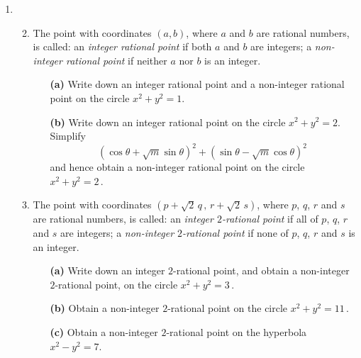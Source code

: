 \documentclass[a4, 11pt]{report}
\newlength{\qspace}
\newcounter{qnumber}
\newenvironment{question}%
 {\vspace{\qspace}
  \begin{enumerate}[\bfseries 1\quad][10]%
    \setcounter{enumi}{\value{qnumber}}%
    \item%
 }
{
  \end{enumerate}
  \filbreak
  \stepcounter{qnumber}
 }
\newenvironment{questionparts}[1][1]%
 {
  \begin{enumerate}[\bfseries (i)]%
    \setcounter{enumii}{#1}
    \addtocounter{enumii}{-1}
    \setlength{\itemsep}{5mm}
    \setlength{\parskip}{8pt}
 }
 {
  \end{enumerate}
 }
\begin{document}
\begin{question}
\begin{questionparts}
\item The point with coordinates $(a, b)$, 
where $a$ and $b$  are rational numbers,
  is called:
\newline
\hspace*{1cm} 
an {\em integer rational point} if both $a$ and $b$ are integers;
\newline\hspace*{1cm}
a {\em non-integer rational point} if neither $a$ nor $b$ is an integer.





\begin{itemize}

\item[\bf (a)]
Write down an integer rational point and a non-integer rational point
on the circle $x^2+y^2 =1$.

\item [\bf (b)]
 Write down an integer rational point on the circle
$x^2+y^2=2$.
Simplify
\[
(\cos\theta + \sqrt m \sin\theta)^2 +
(\sin\theta - \sqrt m \cos\theta)^2 \,
\]
and hence obtain a non-integer rational point on the circle $x^2+y^2=2\,$.
\end{itemize}

\item
The point with coordinates $(p+\sqrt 2 \, q\,,\, r+\sqrt 2 \, s)$, where
 $p$, $q$, $r$ and $s$ 
are rational numbers, is called:
\newline\hspace*{1cm}
an {\em integer $2$-rational point} if all of 
 $p$, $q$, $r$ and $s$ 
 are integers;
\newline\hspace*{1cm}
a {\em non-integer $2$-rational point} if none of  
 $p$, $q$, $r$ and $s$ 
 is an integer.


\begin{itemize}
\item[\bf (a)]
Write down an  integer $2$-rational point, and 
obtain a non-integer $2$-rational point, on  the circle $x^2+y^2=3\,$.

\item [\bf(b)]
Obtain a non-integer $2$-rational point 
on the circle $x^2+y^2=11\,$.

\item [\bf(c)]Obtain a  non-integer $2$-rational point 
on the hyperbola $x^2-y^2 =7 $.

\end{itemize}

\end{questionparts}
	\end{question}
	
\end{document}
